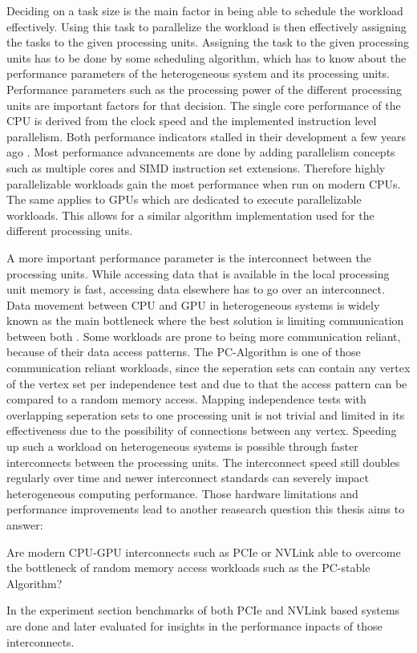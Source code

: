 Deciding on a task size is the main factor in being able to schedule the workload effectively. Using this task to parallelize the workload is then effectively assigning the tasks to the given processing units. Assigning the task to the given processing units has to be done by some scheduling algorithm, which has to know about the performance parameters of the heterogeneous system and its processing units.
Performance parameters such as the processing power of the different processing units are important factors for that decision. The single core performance of the CPU is derived from the clock speed and the implemented instruction level parallelism. Both performance indicators stalled in their development a few years ago \cite{sutterFreeLunchFundamental2013}. Most performance advancements are done by adding parallelism concepts such as multiple cores and SIMD instruction set extensions. Therefore highly parallelizable workloads gain the most performance when run on modern CPUs. The same applies to GPUs which are dedicated to execute parallelizable workloads.
This allows for a similar algorithm implementation used for the different processing units.

A more important performance parameter is the interconnect between the processing units. While accessing data that is available in the local processing unit memory is fast, accessing data elsewhere has to go over an interconnect. Data movement between CPU and GPU in heterogeneous systems is widely known as the main bottleneck where the best solution is limiting communication between both \cite{hazarikaSurveyMemoryManagement2019}. Some workloads are prone to being more communication reliant, because of their data access patterns. The PC-Algorithm is one of those communication reliant workloads, since the seperation sets can contain any vertex of the vertex set per independence test and due to that the access pattern can be compared to a random memory access. Mapping independence tests with overlapping seperation sets to one processing unit is not trivial and limited in its effectiveness due to the possibility of connections between any vertex. Speeding up such a workload on heterogeneous systems is possible through faster interconnects between the processing units. The interconnect speed still doubles regularly over time \cite{NVLink2021} and newer interconnect standards can severely impact heterogeneous computing performance.
Those hardware limitations and performance improvements lead to another reasearch question this thesis aims to answer:

Are modern CPU-GPU interconnects such as PCIe or NVLink able to overcome the bottleneck of random memory access workloads such as the PC-stable Algorithm?

In the experiment section benchmarks of both PCIe and NVLink based systems are done and later evaluated for insights in the performance inpacts of those interconnects.